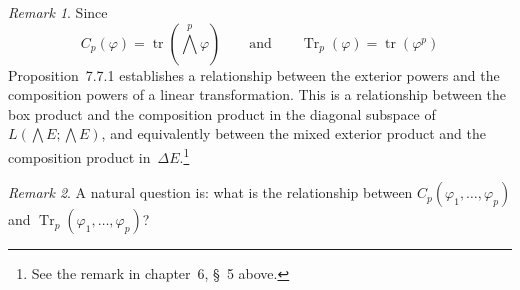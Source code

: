 \documentclass[letterpaper,12pt]{article}
\DeclareMathOperator{\tr}{tr}
\DeclareMathOperator{\Tr}{Tr}
\newcommand{\bigeprod}{\bigwedge}
\newcommand{\medeprod}{{\textstyle\bigeprod}}
\theoremstyle{definition}
\theoremstyle{remark}
\newtheorem*{rmk}{Remark}
\begin{document}
\begin{rmk}
Since
\[C_p(\varphi)=\tr(\medeprod^p\varphi)\qquad\text{and}\qquad\Tr_p(\varphi)=\tr(\varphi^p)\]
Proposition~7.7.1 establishes a relationship between the exterior powers and the composition powers of a linear transformation. This is a relationship between the box product and the composition product in the diagonal subspace of~\(L(\medeprod E;\medeprod E)\), and equivalently between the mixed exterior product and the composition product in~\(\Delta E\).\footnote{See the remark in chapter~6, \S~5 above.}
\end{rmk}

\begin{rmk}
A natural question is: what is the relationship between \(C_p(\varphi_1,\ldots,\varphi_p)\) and \(\Tr_p(\varphi_1,\ldots,\varphi_p)\)?
\end{rmk}
\end{document}
